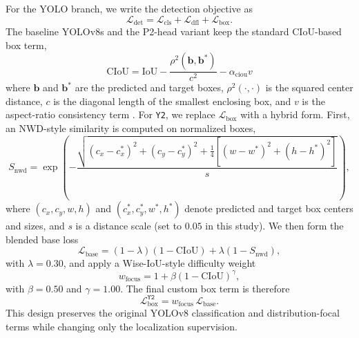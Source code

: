 \documentclass[cmc,article,submit,moreauthors,pdftex]{Definitions/tsp}
\begin{document}
For the YOLO branch, we write the detection objective as
\begin{equation}

        \mathcal{L}_{\text{det}} = \mathcal{L}_{\text{cls}} + \mathcal{L}_{\text{dfl}} + \mathcal{L}_{\text{box}}.
\end{equation}
The baseline YOLOv8s and the P2-head variant keep the standard CIoU-based box term,
\begin{equation}
\mathrm{CIoU} = \mathrm{IoU}
- \frac{\rho^2(\mathbf{b}, \mathbf{b}^{*})}{c^2}
- \alpha_{\mathrm{ciou}} v
\end{equation}
where $\mathbf{b}$ and $\mathbf{b}^{\ast}$ are the predicted and target boxes, $\rho^2(\cdot,\cdot)$ is the squared center distance, $c$ is the diagonal length of the smallest enclosing box, and $v$ is the aspect-ratio consistency term \citep{zheng_2020_diou}. For \texttt{Y2}, we replace $\mathcal{L}_{\text{box}}$ with a hybrid form. First, an NWD-style similarity is computed on normalized boxes,
\begin{equation}
S_{\mathrm{nwd}} = \exp\!\left(
-\frac{
\sqrt{
(c_x-c_x^{\ast})^2 + (c_y-c_y^{\ast})^2 +
\frac{1}{4}\left[(w-w^{\ast})^2 + (h-h^{\ast})^2\right]
}
}{s}
\right),
\end{equation}
where $(c_x, c_y, w, h)$ and $(c_x^{\ast}, c_y^{\ast}, w^{\ast}, h^{\ast})$ denote predicted and target box centers and sizes, and $s$ is a distance scale (set to $0.05$ in this study). We then form the blended base loss
\begin{equation}
\mathcal{L}_{\text{base}} = (1-\lambda)(1-\mathrm{CIoU}) + \lambda(1-S_{\mathrm{nwd}}),
\end{equation}
with $\lambda = 0.30$, and apply a Wise-IoU-style difficulty weight
\begin{equation}
w_{\mathrm{focus}} = 1 + \beta (1-\mathrm{CIoU})^{\gamma},
\end{equation}
with $\beta = 0.50$ and $\gamma = 1.00$. The final custom box term is therefore
\begin{equation}
\mathcal{L}_{\text{box}}^{\texttt{Y2}} = w_{\mathrm{focus}} \, \mathcal{L}_{\text{base}}.
\end{equation}
This design preserves the original YOLOv8 classification and distribution-focal terms while changing only the localization supervision.
\end{document}
